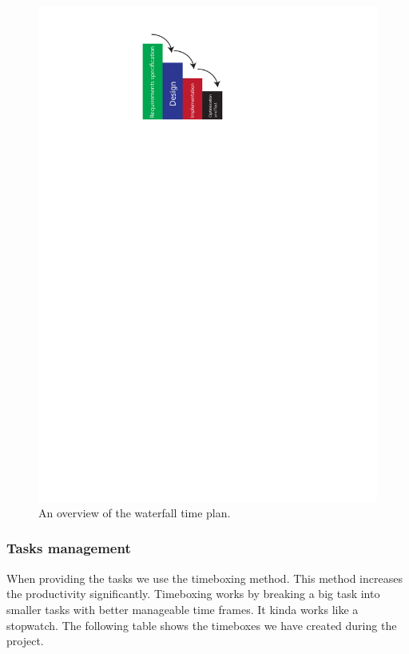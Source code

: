 \begin{figure}[h]
  \centering
  \includegraphics[scale=0.6]{Figures/Waterfall}
  \caption{An overview of the waterfall time plan.}
\label{fig:Waterfall}
\end{figure}


\subsubsection{Tasks management}
When providing the tasks we use the timeboxing method.
This method increases the productivity significantly.
Timeboxing works by breaking a big task into smaller tasks with better manageable time frames.
It kinda works like a stopwatch. The following table shows the timeboxes we have
created during the project.

